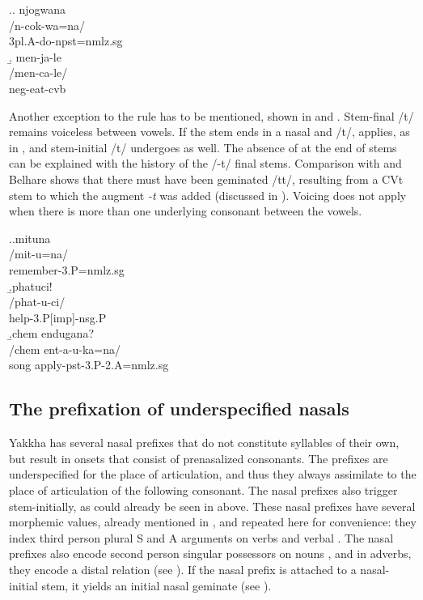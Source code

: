  
 \ex.\a. \glll njogwana\\
 /n-cok-wa=na/\\
 {\sc 3pl.A-}do{\sc -npst=nmlz.sg}\\
 \b. \glll men-ja-le\\
 /men-ca-le/\\
 {\sc neg-}eat{\sc -cvb}\\
 

Another exception to the  rule has to be mentioned, shown in \Next[a] and \Next[b]. Stem-final /t/ remains voiceless between vowels. If the stem ends in a nasal and /t/,  applies, as in \Next[c], and stem-initial /t/ undergoes  as well. The absence of  at the end of stems can be explained with the history of the  /-t/ final stems. Comparison with  and Belhare \citep{Bickel2003Belhare, Bickeletal2007Free} shows that there must have been geminated /tt/, resulting from a CVt stem to which the augment \emph{-t} was added (discussed in ). Voicing does not apply when there is more than one underlying consonant between the vowels. 
			
			\ex.\a.\glll mituna\\
			/mit-u=na/\\
			remember{\sc [pst]-3.P=nmlz.sg}\\
			\b.\glll  phatuci!\\
			/phat-u-ci/\\
			help{\sc -3.P[imp]-nsg.P}\\
			\b.\glll chem endugana?\\
			/chem ent-a-u-ka=na/\\
			song apply{\sc -pst-3.P-2.A=nmlz.sg}\\
	 
	 
\subsection{The prefixation of underspecified nasals}\label{nas-pref}		 
		 
Yakkha has several nasal prefixes that do not constitute  syllables of their own, but result in onsets that consist of prenasalized consonants. The prefixes are underspecified for the place of articulation, and thus they always assimilate to the place of articulation of the following consonant. The nasal prefixes also trigger  stem-initially, as could already be seen in  above. These nasal prefixes have several morphemic values, already mentioned in , and repeated here for convenience: they index third person plural S and A arguments on verbs \Next[a] and verbal  \Next[b]. The nasal prefixes also encode second person singular possessors on nouns \Next[c], and in adverbs, they encode a distal relation (see \Next[d]). If the nasal prefix is attached to a nasal-initial stem, it yields an initial nasal geminate (see \NNext).
 
